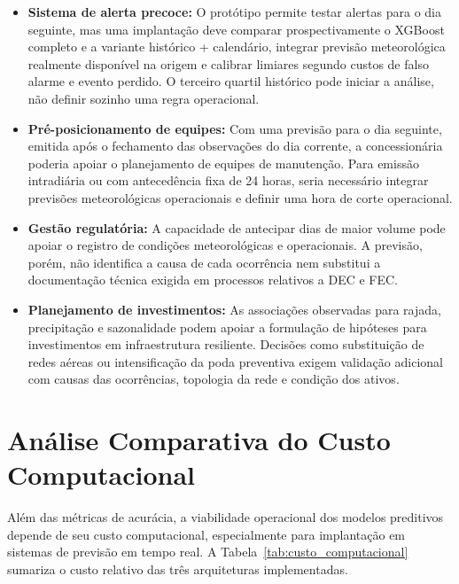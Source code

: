 \begin{itemize}
    \item \textbf{Sistema de alerta precoce:} O protótipo permite testar alertas para o dia seguinte, mas uma implantação deve comparar prospectivamente o XGBoost completo e a variante histórico + calendário, integrar previsão meteorológica realmente disponível na origem e calibrar limiares segundo custos de falso alarme e evento perdido. O terceiro quartil histórico pode iniciar a análise, não definir sozinho uma regra operacional.

    \item \textbf{Pré-posicionamento de equipes:} Com uma previsão para o dia seguinte, emitida após o fechamento das observações do dia corrente, a concessionária poderia apoiar o planejamento de equipes de manutenção. Para emissão intradiária ou com antecedência fixa de 24 horas, seria necessário integrar previsões meteorológicas operacionais e definir uma hora de corte operacional.

    \item \textbf{Gestão regulatória:} A capacidade de antecipar dias de maior volume pode apoiar o registro de condições meteorológicas e operacionais. A previsão, porém, não identifica a causa de cada ocorrência nem substitui a documentação técnica exigida em processos relativos a DEC e FEC.

    \item \textbf{Planejamento de investimentos:} As associações observadas para rajada, precipitação e sazonalidade podem apoiar a formulação de hipóteses para investimentos em infraestrutura resiliente. Decisões como substituição de redes aéreas ou intensificação da poda preventiva exigem validação adicional com causas das ocorrências, topologia da rede e condição dos ativos.
\end{itemize}

\section{Análise Comparativa do Custo Computacional}

Além das métricas de acurácia, a viabilidade operacional dos modelos preditivos depende de seu custo computacional, especialmente para implantação em sistemas de previsão em tempo real. A Tabela~\ref{tab:custo_computacional} sumariza o custo relativo das três arquiteturas implementadas.

